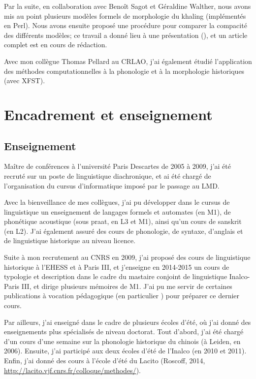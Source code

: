 \documentclass[oldfontcommands,oneside,a4paper,11pt]{article}
\begin{document}
Par la suite, en collaboration avec Benoît Sagot et Géraldine Walther, nous avons mis au point plusieurs modèles formels de morphologie du khaling (implémentés en Perl). Nous avons ensuite proposé une procédure pour comparer la compacité des différents modèles; ce travail a donné lieu à une présentation (\citealt{walther14compactness}), et un article complet est en cours de rédaction.
 
 Avec mon collègue Thomas Pellard au CRLAO, j'ai également étudié l'application des méthodes computationnelles à la phonologie et à la morphologie historiques (avec XFST). 

\section{Encadrement et enseignement}

\subsection{Enseignement} \label{sec:enseignement}
Maître de conférences à l'université Paris Descartes de 2005 à 2009, j'ai été recruté sur un poste de linguistique diachronique, et ai été chargé de l'organisation du cursus d'informatique imposé par le passage au LMD.

Avec la bienveillance de mes collègues, j'ai pu développer dans le cursus de linguistique un enseignement de langages formels et automates (en M1), de phonétique acoustique (sous praat, en L3 et M1), ainsi qu'un cours de sanskrit (en L2). J'ai également assuré des cours de phonologie, de syntaxe, d'anglais et de linguistique historique au niveau licence.

Suite à mon recrutement au CNRS en 2009, j'ai proposé des cours de linguistique historique à l'EHESS et à Paris III, et j'enseigne en 2014-2015 un cours de typologie et description dans le cadre du mastaire conjoint de linguistique Inalco-Paris III, et dirige plusieurs mémoires de M1. J'ai pu me servir de certaines publications à vocation pédagogique (en particulier \citealt{jacques14inverse}) pour préparer ce dernier cours.

Par ailleurs, j'ai enseigné dans le cadre de plusieurs écoles d'été, où j'ai donné des enseignements plus spécialisés de niveau doctorat. Tout d'abord, j'ai été chargé d'un cours d'une semaine sur la phonologie historique du chinois (à Leiden, en 2006). Ensuite, j'ai participé aux deux écoles d'été de l'Inalco (en 2010 et 2011). Enfin, j'ai donné des cours à l'école d'été du Lacito (Roscoff, 2014, \url{http://lacito.vjf.cnrs.fr/colloque/methodes/}).
 
\end{document}
